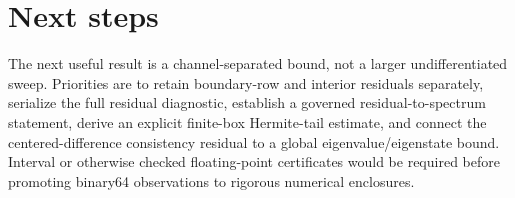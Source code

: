\documentclass[11pt]{article}
\begin{document}
\section{Next steps}

The next useful result is a channel-separated bound, not a larger undifferentiated
sweep.  Priorities are to retain boundary-row and interior residuals separately,
serialize the full residual diagnostic, establish a governed residual-to-spectrum
statement, derive an explicit finite-box Hermite-tail estimate, and connect the
centered-difference consistency residual to a global eigenvalue/eigenstate bound.
Interval or otherwise checked floating-point certificates would be required before
promoting binary64 observations to rigorous numerical enclosures.
\end{document}
